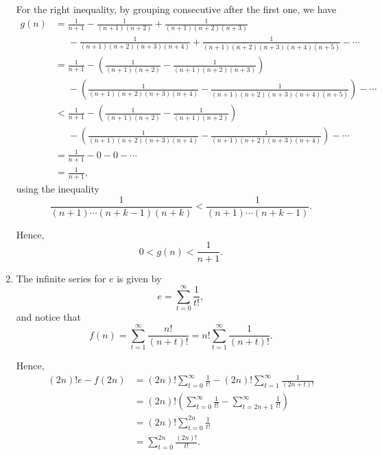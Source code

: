 \begin{enumerate}
          For the right inequality, by grouping consecutive after the first one, we have
          \begin{align*}
              g(n) & = \frac{1}{n + 1} - \frac{1}{(n + 1) (n + 2)} + \frac{1}{(n + 1) (n + 2) (n + 3)}                                                 \\
                   & \phantom{=} - \frac{1}{(n + 1) (n + 2) (n + 3) (n + 4)} + \frac{1}{(n + 1) (n + 2) (n + 3) (n + 4) (n + 5)} - \cdots              \\
                   & = \frac{1}{n + 1} - \left(\frac{1}{(n + 1) (n + 2)} - \frac{1}{(n + 1) (n + 2) (n + 3)}\right)                                    \\
                   & \phantom{=} - \left(\frac{1}{(n + 1) (n + 2) (n + 3) (n + 4)} - \frac{1}{(n + 1) (n + 2) (n + 3) (n + 4) (n + 5)}\right) - \cdots \\
                   & < \frac{1}{n + 1} - \left(\frac{1}{(n + 1) (n + 2)} - \frac{1}{(n + 1) (n + 2)}\right)                                            \\
                   & \phantom{=} - \left(\frac{1}{(n + 1) (n + 2) (n + 3) (n + 4)} - \frac{1}{(n + 1) (n + 2) (n + 3) (n + 4)}\right) - \cdots         \\
                   & = \frac{1}{n + 1} - 0 - 0 - \cdots                                                                                                \\
                   & = \frac{1}{n + 1},
          \end{align*}
          using the inequality
          \[
              \frac{1}{(n + 1) \cdots (n + k - 1) (n + k)} < \frac{1}{(n + 1) \cdots (n + k - 1)}.
          \]

          Hence,
          \[
              0 < g(n) < \frac{1}{n + 1}.
          \]

    \item The infinite series for \(e\) is given by
          \[
              e = \sum_{t = 0}^{\infty} \frac{1}{t!},
          \]
          and notice that
          \[
              f(n) = \sum_{t = 1}^{\infty} \frac{n!}{(n + t)!} = n! \sum_{t = 1}^{\infty} \frac{1}{(n + t)!}.
          \]

          Hence,
          \begin{align*}
              (2n)! e - f(2n) & = (2n)! \sum_{t = 0}^{\infty} \frac{1}{t!} - (2n)! \sum_{t = 1}^{\infty} \frac{1}{(2n + t)!}      \\
                              & = (2n)! \left(\sum_{t = 0}^{\infty} \frac{1}{t!} - \sum_{t = 2n + 1}^{\infty} \frac{1}{t!}\right) \\
                              & = (2n)! \sum_{t = 0}^{2n} \frac{1}{t!}                                                            \\
                              & = \sum_{t = 0}^{2n} \frac{(2n)!}{t!}.
          \end{align*}


\end{enumerate}
